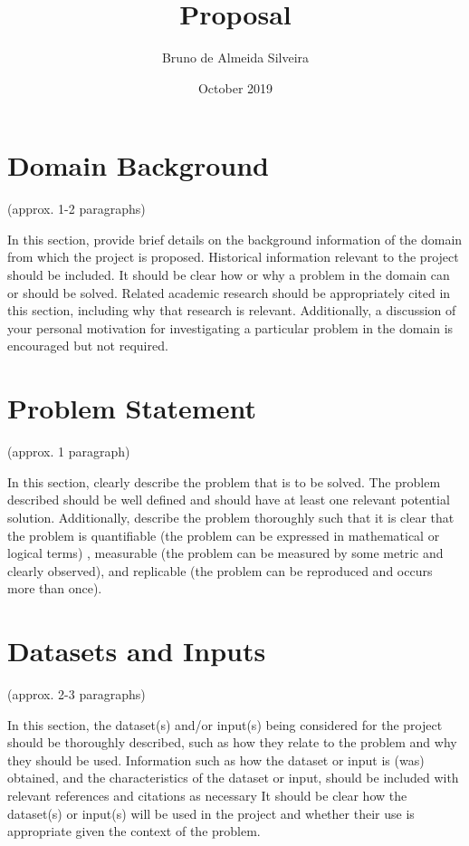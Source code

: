 \documentclass[11pt]{article}
\title{\textbf{Proposal}}
\author{Bruno de Almeida Silveira}
\date{October 2019}
\begin{document}
\maketitle

\section{Domain Background}

(approx. 1-2 paragraphs)

In this section, provide brief details on the background information of the domain from which the project is proposed. Historical information relevant to the project should be included. It should be clear how or why a problem in the domain can or should be solved. Related academic research should be appropriately cited in this section, including why that research is relevant. Additionally, a discussion of your personal motivation for investigating a particular problem in the domain is encouraged but not required.

\section{Problem Statement}

(approx. 1 paragraph)

In this section, clearly describe the problem that is to be solved. The problem described should be well defined and should have at least one relevant potential solution. Additionally, describe the problem thoroughly such that it is clear that the problem is quantifiable (the problem can be expressed in mathematical or logical terms) , measurable (the problem can be measured by some metric and clearly observed), and replicable (the problem can be reproduced and occurs more than once).

\section{Datasets and Inputs}

(approx. 2-3 paragraphs)

In this section, the dataset(s) and/or input(s) being considered for the project should be thoroughly described, such as how they relate to the problem and why they should be used. Information such as how the dataset or input is (was) obtained, and the characteristics of the dataset or input, should be included with relevant references and citations as necessary It should be clear how the dataset(s) or input(s) will be used in the project and whether their use is appropriate given the context of the problem.
\end{document}
